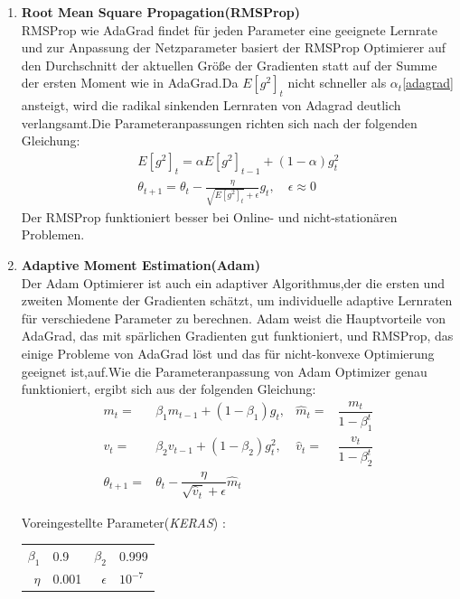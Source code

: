 \documentclass[12pt,a4paper]{scrartcl}
\numberwithin{equation}{section}
\begin{document}
\begin{enumerate}
\item \textbf{Root Mean Square Propagation(RMSProp)}\\
RMSProp wie AdaGrad findet für jeden Parameter eine geeignete Lernrate und zur Anpassung der Netzparameter basiert der RMSProp Optimierer auf den Durchschnitt der aktuellen Größe der Gradienten statt auf der Summe der ersten Moment wie in AdaGrad.Da $ E[g^2]_t $ nicht schneller als $ \alpha_{t} $\eqref{adagrad} ansteigt, wird die radikal sinkenden Lernraten von Adagrad deutlich verlangsamt.Die Parameteranpassungen richten sich nach der folgenden Gleichung:
\begin{equation}\label{RMSProp}
\begin{split}
E[g^2]_t =\alpha E[g^2]_{t-1} +(1-\alpha)g^2_{t}\\
\theta_{t+1} = \theta_{t} -\frac{\eta}{\sqrt{E[g^2]_t}+\epsilon} g_t, \quad  \epsilon \approx 0
\end{split}
\end{equation}
Der RMSProp funktioniert besser bei Online- und nicht-stationären Problemen.

\item \textbf{Adaptive Moment Estimation(Adam)}\label{Adam}\\
Der Adam \cite{adam} Optimierer ist auch ein adaptiver Algorithmus,der die ersten und zweiten Momente der Gradienten schätzt, um individuelle adaptive Lernraten für verschiedene Parameter zu berechnen.
Adam weist die Hauptvorteile von AdaGrad, das mit spärlichen Gradienten gut funktioniert, und RMSProp, das einige Probleme von AdaGrad löst und das für nicht-konvexe Optimierung geeignet ist,auf.Wie die Parameteranpassung von Adam Optimizer genau funktioniert, ergibt sich aus der folgenden Gleichung: 
\begin{equation}\label{ADAM}
\begin{aligned}
m_{t}=& \beta_{1}m_{t-1}+(1-\beta_{1})g_{t}, &  \widehat{m}_{t} =& \dfrac{m_{t}}{1-\beta_{1}^t}\\
v_{t}=& \beta_{2}v_{t-1}+(1-\beta_{2})g^2_t,&\widehat{v}_{t} =&\dfrac{v_t}{1-\beta_{2}^t}\\
\theta_{t+1} =& \theta_{t} -\dfrac{\eta}{\sqrt{\widehat{v}_{t}}+\epsilon}\widehat{m}_{t}
\end{aligned}
\end{equation}
\begin{center}
	Voreingestellte Parameter(\textit{KERAS}) :
	\begin{tabular}{r@{: }l r@{: }l}
		$ \beta_{1}$ & 0.9 &$ \beta_{2} $& 0.999\\
		$ \eta$& 0.001& $ \epsilon $ & $ 10^{-7} $
	\end{tabular}
\end{center}


\end{enumerate}
\end{document}
